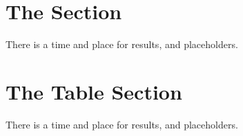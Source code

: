 \section{The Section}
There is a time and place for results, and placeholders.
\section{The Table Section}
There is a time and place for results, and placeholders.

